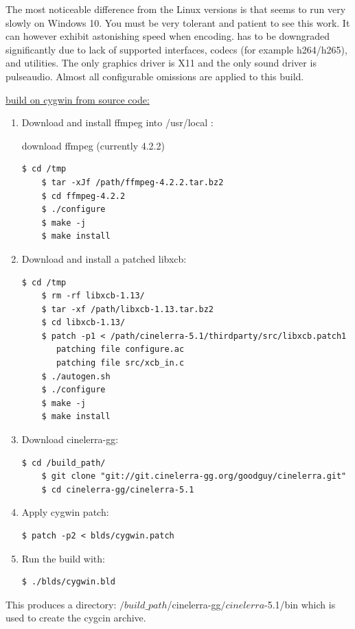 The most noticeable difference from the Linux versions is that \CGG{} seems to run 
very slowly on Windows 10. You must be very tolerant and patient to see this work.  
It can however exhibit astonishing speed when encoding.  \CGG{} has to be downgraded significantly due to lack of supported interfaces, codecs (for example h264/h265), and utilities.  
The only graphics driver is X11 and the only sound driver is pulseaudio.  Almost all configurable
omissions are applied to this build.  

\underline{\CGG{} build on cygwin from source code:}

\begin{enumerate}
	\item Download and install ffmpeg into /usr/local :

   	download ffmpeg (currently 4.2.2)
\begin{lstlisting}[numbers=none]
	$ cd /tmp
	$ tar -xJf /path/ffmpeg-4.2.2.tar.bz2
	$ cd ffmpeg-4.2.2
	$ ./configure
	$ make -j
	$ make install
\end{lstlisting}
	\item Download and install a patched libxcb:
\begin{lstlisting}[numbers=none]
	$ cd /tmp
	$ rm -rf libxcb-1.13/
	$ tar -xf /path/libxcb-1.13.tar.bz2
	$ cd libxcb-1.13/
	$ patch -p1 < /path/cinelerra-5.1/thirdparty/src/libxcb.patch1
	   patching file configure.ac
	   patching file src/xcb_in.c
	$ ./autogen.sh
	$ ./configure
	$ make -j
	$ make install
\end{lstlisting}
	\item Download cinelerra-gg:
\begin{lstlisting}[numbers=none]
	$ cd /build_path/
	$ git clone "git://git.cinelerra-gg.org/goodguy/cinelerra.git"
	$ cd cinelerra-gg/cinelerra-5.1
\end{lstlisting}
	\item Apply cygwin patch:
\begin{lstlisting}[numbers=none]
	$ patch -p2 < blds/cygwin.patch
\end{lstlisting}
	\item Run the build with:
\begin{lstlisting}[numbers=none]
	$ ./blds/cygwin.bld
\end{lstlisting}
\end{enumerate}

This produces a directory: $/build\_path$/cinelerra-gg$/cinelerra$-5.1/bin \newline
which is used to create the cygcin archive.

